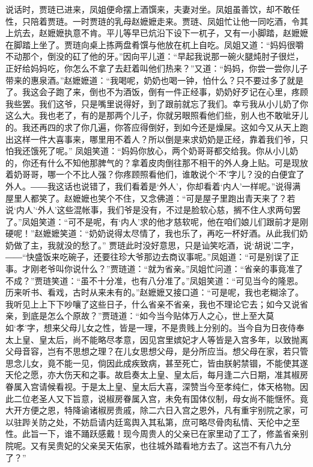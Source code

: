 \documentclass[12pt,oneside]{book}
\begin{document}
说话时，贾琏已进来，凤姐便命摆上酒馔来，夫妻对坐。凤姐虽善饮，却不敢任性，只陪着贾琏。一时贾琏的乳母赵嬷嬷走来。贾琏、凤姐忙让他一同吃酒，令其上炕去，赵嬷嬷执意不肯。平儿等早已炕沿下设下一杌子，又有一小脚踏，赵嬷嬷在脚踏上坐了。贾琏向桌上拣两盘肴馔与他放在杌上自吃。凤姐又道：“妈妈很嚼不动那个，倒没的矼了他的牙。”因向平儿道：“早起我说那一碗火腿炖肘子很烂，正好给妈妈吃，你怎么不拿了去赶着叫他们热来？”又道：“妈妈，你尝一尝你儿子带来的惠泉酒。”赵嬷嬷道：“我喝呢，奶奶也喝一钟，怕什么？只不要过多了就是了。我这会子跑了来，倒也不为酒饭，倒有一件正经事，奶奶好歹记在心里，疼顾我些罢。我们这爷，只是嘴里说得好，到了跟前就忘了我们。幸亏我从小儿奶了你这么大。我也老了，有的是那两个儿子，你就另眼照看他们些，别人也不敢呲牙儿的。我还再四的求了你几遍，你答应得倒好，到如今还是燥屎。这如今又从天上跑出这样一件大喜事来，哪里用不着人？所以倒是来求奶奶是正经，靠着我们爷，只怕我还饿死了呢。”
凤姐笑道：“妈妈你放心，两个奶哥哥都交给我。你从小儿奶的，你还有什么不知他那脾气的？拿着皮肉倒往那不相干的外人身上贴。可是现放着奶哥哥，哪一个不比人强？你疼顾照看他们，谁敢说个‘不’字儿？没的白便宜了外人。――我这话也说错了，我们看着是‘外人’，你却看着‘内人’一样呢。”说得满屋里人都笑了。赵嬷嬷也笑个不住，又念佛道：“可是屋子里跑出青天来了？若说‘内人’‘外人’这些混帐事，我们爷是没有，不过是脸软心慈，搁不住人求两句罢了。”凤姐笑道：“可不是呢，有‘内人’求的他才慈软呢，他在咱们娘儿们跟前才是刚硬呢！”赵嬷嬷笑道：“奶奶说得太尽情了，我也乐了，再吃一杯好酒。从此我们奶奶做了主，我就没的愁了。”
贾琏此时没好意思，只是讪笑吃酒，说‘胡说’二字，――“快盛饭来吃碗子，还要往珍大爷那边去商议事呢。”凤姐道：“可是别误了正事。才刚老爷叫你说什么？”贾琏道：“就为省亲。”凤姐忙问道：“省亲的事竟准了不成？”贾琏笑道：“虽不十分准，也有八分准了。”凤姐笑道：“可见当今的隆恩。历来听书、看戏，古时从来未有的。”赵嬷嬷又接口道：“可是呢，我也老糊涂了。我听见上上下下吵嚷了这些日子，什么省亲不省亲，我也不理论它去；如今又说省亲，到底是怎么个原故？”贾琏道：“如今当今贴体万人之心，世上至大莫如‘孝’字，想来父母儿女之性，皆是一理，不是贵贱上分别的。当今自为日夜侍奉太上皇、皇太后，尚不能略尽孝意，因见宫里嫔妃才人等皆是入宫多年，以致抛离父母音容，岂有不思想之理？在儿女思想父母，是分所应当。想父母在家，若只管思念儿女，竟不能一见，倘因此成疾致病，甚至死亡，皆由朕躬禁锢，不能使其遂天伦之愿，亦大伤天和之事。故启奏太上皇、皇太后，每月逢二六日期，准其椒房眷属入宫请候看视。于是太上皇、皇太后大喜，深赞当今至孝纯仁，体天格物。因此二位老圣人又下旨意，说椒房眷属入宫，未免有国体仪制，母女尚不能惬怀。竟大开方便之恩，特降谕诸椒房贵戚，除二六日入宫之恩外，凡有重宇别院之家，可以驻跸关防之处，不妨启请内廷鸾舆入其私第，庶可略尽骨肉私情、天伦中之至性。此旨一下，谁不踊跃感戴！现今周贵人的父亲已在家里动了工了，修盖省亲别院呢。又有吴贵妃的父亲吴天佑家，也往城外踏看地方去了。这岂不有八九分了？”
\end{document}
